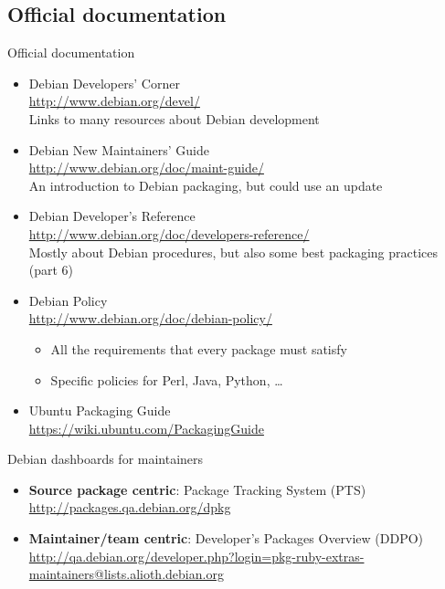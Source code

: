 \documentclass[10pt,final]{beamer}
\begin{document}
\subsection{Official documentation}
\begin{frame}{Official documentation}
  \begin{itemize}
  \item Debian Developers' Corner\\
    \url{http://www.debian.org/devel/}\\
    {\small Links to many resources about Debian development}
    \br
  \item Debian New Maintainers' Guide\\
    \url{http://www.debian.org/doc/maint-guide/}\\
    {\small An introduction to Debian packaging, but could use an update}
    \br
  \item Debian Developer's Reference\\
    \url{http://www.debian.org/doc/developers-reference/}\\
    {\small Mostly about Debian procedures, but also some best packaging practices (part 6)}
    \br
  \item Debian Policy\\
    \url{http://www.debian.org/doc/debian-policy/}\\
    
    {\small \begin{itemize}
      \item \small All the requirements that every package must satisfy
      \item \small Specific policies for Perl, Java, Python, \ldots
      \end{itemize}}
    \br
    
  \item Ubuntu Packaging Guide\\
    \url{https://wiki.ubuntu.com/PackagingGuide}
  \end{itemize}
\end{frame}

\begin{frame}{Debian dashboards for maintainers}
  \begin{itemize}
	  \item \textbf{Source package centric}: Package Tracking System (PTS)\\
    \url{http://packages.qa.debian.org/dpkg}
    \br
  \item \textbf{Maintainer/team centric}: Developer's Packages Overview (DDPO)\\
    \url{http://qa.debian.org/developer.php?login=pkg-ruby-extras-maintainers@lists.alioth.debian.org}
  \end{itemize}
\end{frame}
\end{document}
